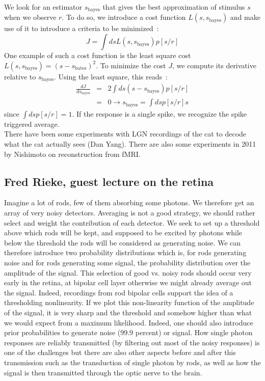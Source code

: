 \documentclass[10pt,a4paper]{article}
\begin{document}
We look for an estimator $s_{\mbox{bayes}}$ that gives the best
approximation of stimulus $s$ when we observe $r$. To do so, we
introduce a cost function $L(s, s_{\mbox{bayes}})$ and make use of it
to introduce a criteria to be minimized~:
\begin{equation}
J = \int ds L(s, s_{\mbox{bayes}}) p[s/r]
\end{equation}
One example of such a cost function is the least square cost $L(s,
s_{\mbox{bayes}}) = (s - s_{\mbox{bates}})^2$. To minimize the cost
$J$, we compute its derivative relative to $s_{\mbox{bayes}}$. Using
the least square, this reads~:
\begin{eqnarray}
\frac{dJ}{d s_{\mbox{bayes}}} &=& 2 \int ds(s - s_{\mbox{bayes}})
p[s/r]\\
&=& 0 \rightarrow s_{\mbox{bayes}} = \int ds p[s/r] s
\end{eqnarray}
since $\int ds p[s/r] = 1$. If the response is a single spike, we
recognize the spike triggered average.\\

There have been some experiments with LGN recordings of the cat to
decode what the cat actually sees (Dan Yang). There are also some
experiments in 2011 by Nishimoto on reconstruction from fMRI.\\


\subsection{Fred Rieke, guest lecture on the retina}

Imagine a lot of rods, few of them absorbing some photons. We
therefore get an array of very noisy detectors. Averaging is not a
good strategy, we should rather select and weight the contribution of
each detector. We seek to set up a threshold above which rods will be
kept, and supposed to be excited by photons while below the threshold
the rods will be considered as generating noise. We can therefore
introduce two probability distributions which is, for rods generating
noise and for rods generating some signal, the probability
distribution over the amplitude of the signal. This selection of good
vs. noisy rods should occur very early in the retina, at bipolar cell
layer otherwise we might already average out the signal. Indeed,
recordings from rod bipolar cells support the idea of a thresholding
nonlinearity. If we plot this non-linearity function of the amplitude
of the signal, it is very sharp and the threshold and somehow higher
than what we would expect from a maximum likelihood. Indeed, one
should also introduce prior probabilities to generate noise (99.9
percent) or signal. How single photon responses are reliably
transmitted (by filtering out most of the noisy responses) is one of
the challenges but there are also other aspects before and after this
transmission such as the transduction of single photon by rods, as
well as how the signal is then transmitted through the optic nerve to
the brain.
\end{document}

